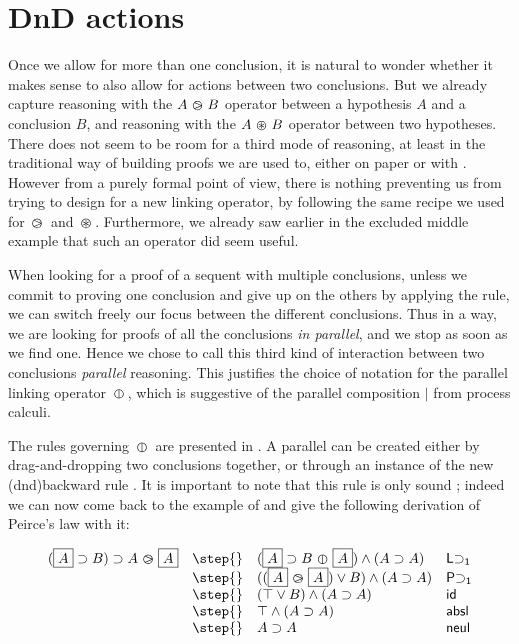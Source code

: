 \section{DnD actions}

Once we allow for more than one conclusion, it is natural to wonder whether it
makes sense to also allow for  actions between two conclusions. But we
already capture \emph{} reasoning with the $A \operatorname{\,\varogreaterthan\,} B$ operator between
a hypothesis $A$ and a conclusion $B$, and \emph{} reasoning with the $A
\operatorname{\,\varoast\,} B$ operator between two hypotheses. There does not seem to be room for a
third mode of reasoning, at least in the traditional way of building proofs we
are used to, either on paper or with . However from a purely
formal point of view, there is nothing preventing us from trying to design
 for a new linking operator, by following the same recipe we used
for $\operatorname{\,\varogreaterthan\,}$ and $\operatorname{\,\varoast\,}$. Furthermore, we already saw earlier in the excluded
middle example that such an operator did seem useful.

When looking for a proof of a sequent with multiple conclusions, unless we
commit to proving one conclusion and give up on the others by applying the
{} rule, we can switch freely our focus between the different
conclusions. Thus in a way, we are looking for proofs of all the conclusions
\emph{in parallel}, and we stop as soon as we find one. Hence we chose to
call this third kind of interaction between two conclusions \emph{parallel}
reasoning. This justifies the choice of notation for the parallel linking
operator $\operatorname{\,\varobar\,}$, which is suggestive of the parallel composition $\mid$ from
process calculi.

The rules governing $\operatorname{\,\varobar\,}$ are presented in . A parallel
 can be created either by drag-and-dropping two conclusions together, or
through an instance of the new \kl(dnd){backward} rule {}. It is
important to note that this rule is only sound \emph{}; indeed we can
now come back to the example of  and give the following
derivation of Peirce's law with it:

$$
\begin{array}{llll}
  (\select{A} \limp B) \limp A \back \select{A}
  &\step{}& (\select{A} \limp B \para \select{A}) \land (A \limp A) &\mathsf{L{\limp}_1} \\
  &\step{}& ((\select{A} \back \select{A}) \lor B) \land (A \limp A) &\mathsf{P{\limp}_1} \\
  &\step{}& (\top \lor B) \land (A \limp A) &\mathsf{id} \\
  &\step{}& \top \land (A \limp A) &\mathsf{absl} \\
  &\step{}& A \limp A &\mathsf{neul}
\end{array}
$$


